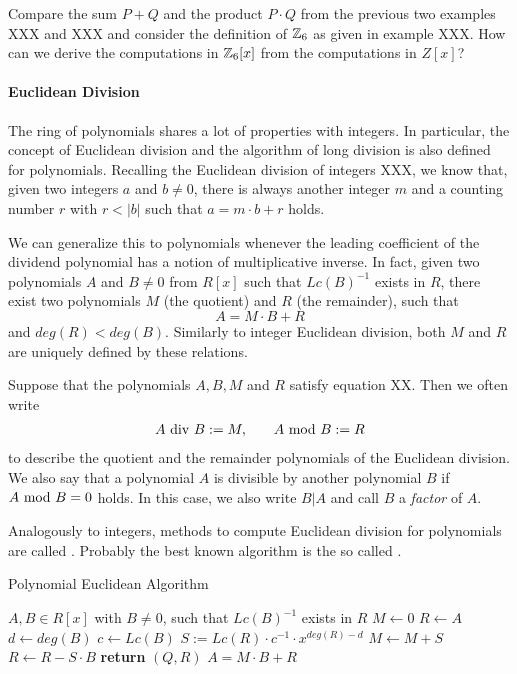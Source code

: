 \begin{exercise}
Compare the sum $P+Q$ and the product $P\cdot Q$ from the previous two examples XXX and XXX and consider the definition of $\mathbb{Z}_6$ as given in example XXX. How can we derive the computations in $\mathbb{Z}_6[x]$ from the computations in $Z[x]$? 
\end{exercise}
\paragraph{Euclidean Division}
The ring of polynomials shares a lot of properties with  integers. In particular, the concept of Euclidean division and the algorithm of long division is also defined for polynomials. Recalling the Euclidean division of integers XXX, we know that, given two integers $a$ and $b\neq 0$, there is always another integer $m$ and a counting number $r$ with $r<|b|$ such that $a = m\cdot b +r$ holds.

We can generalize this to polynomials whenever the leading coefficient of the dividend polynomial has a notion of multiplicative inverse. In fact, given two polynomials $A$ and $B\neq 0$ from $R[x]$ such that $Lc(B)^{-1}$ exists in $R$, there exist two polynomials $M$ (the quotient) and $R$ (the remainder), such that
\begin{equation}
A = M\cdot B + R
\end{equation}
and $deg(R) < deg(B)$. Similarly to integer Euclidean division, both $M$ and $R$ are uniquely defined by these relations. 
\begin{notation}
\label{eq_polynomial_euclidean_division_notation}
Suppose that the polynomials $ A, B, M $ and $ R $ satisfy equation XX. Then we often write 
\begin{equation}
\label{def_integer_division_and_modulus}
\begin{array}{lcr}
A \text{ div } B: = M, & & A \text{ mod } B: = R 
\end{array}
\end{equation}
to describe the quotient and the remainder polynomials of the Euclidean division. We also say that a polynomial $ A $ is divisible by another polynomial $ B $ if $ A \text{ mod } B = 0 $ holds. In this case, we also write $ B | A $ and call $B$ a \textit{factor} of $A$.
\end{notation}
Analogously to integers, methods to compute Euclidean division for polynomials are called . Probably the best known algorithm is the so called . 
\begin{algorithm}\caption{Polynomial Euclidean Algorithm}
\label{alg_ext_euclid_alg}
\begin{algorithmic}[0]
\Require $A,B \in R[x]$ with $B\neq 0$, such that $Lc(B)^{-1}$ exists in $R$
\State $M \gets 0$
\State $R \gets A$
\State $d \gets deg(B)$
\State $c \gets Lc(B)$
\State  $S := Lc(R)\cdot c^{-1}\cdot x^{deg(R)-d}$
\State $M \gets M + S$
\State $R \gets R - S\cdot B$
\EndWhile
\State \textbf{return} $(Q, R)$ 
\EndProcedure
\Ensure $ A=  M \cdot B + R$
\end{algorithmic}
\end{algorithm}

